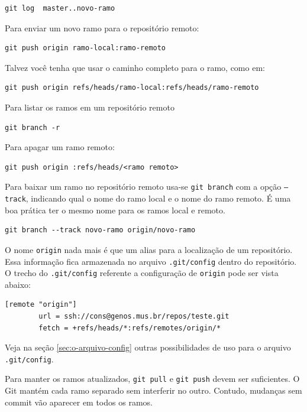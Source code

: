 \documentclass[12pt,brazil]{book}
\begin{document}
\begin{verbatim}
git log  master..novo-ramo
\end{verbatim}

Para enviar um novo ramo para o repositório remoto:

\begin{verbatim}
git push origin ramo-local:ramo-remoto
\end{verbatim}

Talvez você tenha que usar o caminho completo para o ramo, como em:

\begin{verbatim}
git push origin refs/heads/ramo-local:refs/heads/ramo-remoto
\end{verbatim}

Para listar os ramos em um repositório remoto

\begin{verbatim}
git branch -r
\end{verbatim}

Para apagar um ramo remoto:

\begin{verbatim}
git push origin :refs/heads/<ramo remoto>
\end{verbatim}

Para baixar um ramo no repositório remoto usa-se \texttt{git branch}
com a opção \texttt{--track}, indicando qual o nome do ramo local e o
nome do ramo remoto. É uma boa prática ter o mesmo nome para os ramos
local e remoto.

\begin{verbatim}
git branch --track novo-ramo origin/novo-ramo
\end{verbatim}

O nome \texttt{origin} nada mais é que um alias para a localização de
um repositório. Essa informação fica armazenada no arquivo
\texttt{.git/config} dentro do repositório. O trecho do
\texttt{.git/config} referente a configuração de \texttt{origin} pode
ser vista abaixo:

\begin{verbatim}
[remote "origin"]
        url = ssh://cons@genos.mus.br/repos/teste.git
        fetch = +refs/heads/*:refs/remotes/origin/*
\end{verbatim}

Veja na seção \ref{sec:o-arquivo-config} outras possibilidades de uso
para o arquivo \texttt{.git/config}.

Para manter os ramos atualizados, \texttt{git pull} e \texttt{git
  push} devem ser suficientes. O Git mantém cada ramo separado sem
interferir no outro. Contudo, mudanças sem commit vão aparecer em
todos os ramos.
\end{document}
